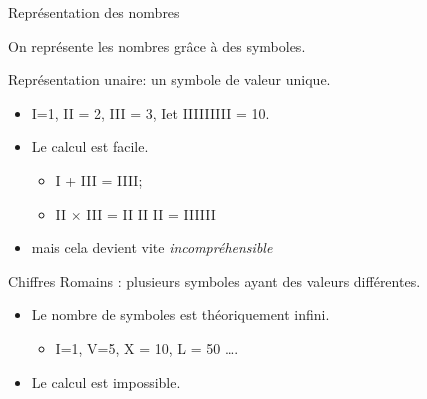 
\begin{frame}{Représentation des nombres}                                                                                                                
  \begin{center}
    \alert{On représente les nombres grâce à des symboles.}
  \end{center}


  \begin{block}{Représentation unaire: un symbole de valeur unique.}
    \begin{itemize}
    \item I=1, II = 2, III = 3, Iet IIIIIIIII = 10.
    \item Le calcul est facile.
      \begin{itemize}
      \item       I + III = IIII; 
      \item II $\times$ III = II II II = IIIIII
      \end{itemize}
    \item<alert@1> mais cela devient vite \emph{incompréhensible}
    \end{itemize}
  \end{block}

  \begin{block}{Chiffres Romains : plusieurs symboles ayant des valeurs différentes.}
    \begin{itemize}
    \item Le nombre de symboles est théoriquement infini.
      \begin{itemize}
      \item I=1, V=5, X = 10, L = 50 \dots.
      \end{itemize}

    \item<alert@1> Le calcul est impossible.
    \end{itemize}
  \end{block}

\end{frame}




